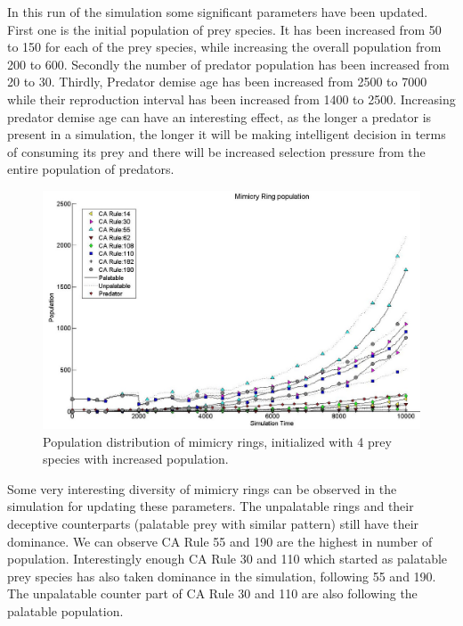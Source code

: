 In this run of the simulation some significant parameters have been updated. First one is the initial population of prey species. It has been increased from 50 to 150 for each of the prey species, while increasing the overall population from 200 to 600. Secondly the number of predator population has been increased from 20 to 30. Thirdly, Predator demise age has been increased from 2500 to 7000 while their reproduction interval has been increased from 1400 to 2500. Increasing predator demise age can have an interesting effect, as the longer a predator is present in a simulation, the longer it will be making intelligent decision in terms of consuming its prey and there will be increased selection pressure from the entire population of predators. 

\begin{figure}[H]
	\centering
	\includegraphics[scale=0.45]{images/simTime10K-4MorePrey}
	\caption[Population distribution of mimicry rings (4 prey species, increased population)]{Population distribution of mimicry rings, initialized with 4 prey species with increased population.}
	\label{fig:plot-4-more-prey}
\end{figure}

Some very interesting diversity of mimicry rings can be observed in the simulation for updating these parameters. The unpalatable rings and their deceptive counterparts (palatable prey with similar pattern) still have their dominance. We can observe CA Rule 55 and 190 are the highest in number of population. Interestingly enough CA Rule 30 and 110 which started as palatable prey species has also taken dominance in the simulation, following 55 and 190. The unpalatable counter part of CA Rule 30 and 110 are also following the palatable population. 

